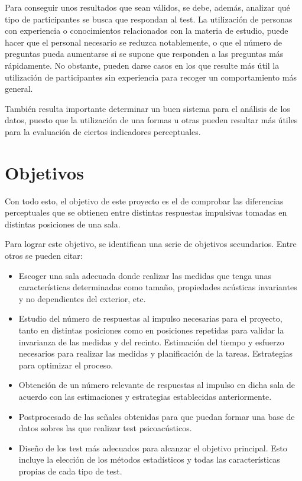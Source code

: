 \documentclass[11pt,a4paper]{book}
\begin{document}
    Para conseguir unos resultados que sean válidos, se debe, además, analizar qué tipo de participantes se busca que respondan al test. La utilización de personas con experiencia o conocimientos relacionados con la materia de estudio, puede hacer que el personal necesario se reduzca notablemente, o que el número de preguntas pueda aumentarse si se supone que responden a las preguntas más rápidamente. No obstante, pueden darse casos en los que resulte más útil la utilización de participantes sin experiencia para recoger un comportamiento más general.
    
    También resulta importante determinar un buen sistema para el análisis de los datos, puesto que la utilización de una formas u otras pueden resultar más útiles para la evaluación de ciertos indicadores perceptuales.
    
    \section{Objetivos}
        Con todo esto, el objetivo de este proyecto es el de comprobar las diferencias perceptuales que se obtienen entre distintas respuestas impulsivas tomadas en distintas posiciones de una sala.
        
        Para lograr este objetivo, se identifican una serie de objetivos secundarios. Entre otros se pueden citar:
        
        \begin{itemize}
            \item Escoger una sala adecuada donde realizar las medidas que tenga unas características determinadas como tamaño, propiedades acústicas invariantes y no dependientes del exterior, etc.
            \item Estudio del número de respuestas al impulso necesarias para el proyecto, tanto en distintas posiciones como en posiciones repetidas para validar la invarianza de las medidas y del recinto. Estimación del tiempo y esfuerzo necesarios para realizar las medidas y planificación de la tareas. Estrategias para optimizar el proceso.
            \item Obtención de un número relevante de respuestas al impulso en dicha sala de acuerdo con las estimaciones y estrategias establecidas anteriormente.
            \item Postprocesado de las señales obtenidas para que puedan formar una base de datos sobres las que realizar test psicoacústicos.
            \item Diseño de los test más adecuados para alcanzar el objetivo principal. Esto incluye la elección de los métodos estadísticos y todas las características propias de cada tipo de test.
      
        \end{itemize}
        
\end{document}
